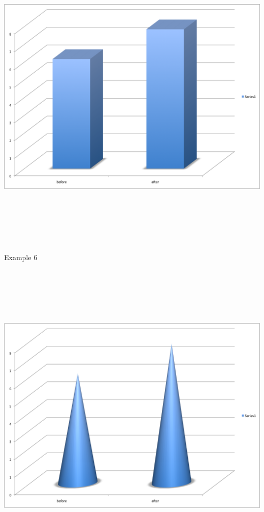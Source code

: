 \documentclass[12pt]{article}
\newcommand{\headsize}{\fontsize{35}{35} \selectfont}
\begin{document}
\centerline{\includegraphics[height=6in]{Figs/fig6r_h.png}}


\newpage


\headsize \color{myyellow}
\hfill \begin{minipage}{5.75in}
\centering
Example 6
\end{minipage}

\vspace{30mm}

\centerline{\includegraphics[height=6in]{Figs/fig6r_i.png}}
\end{document}
